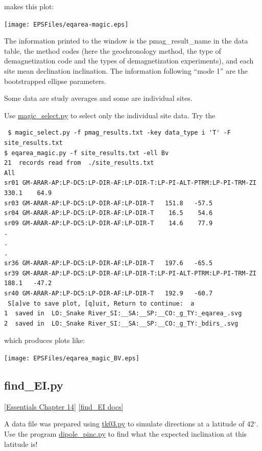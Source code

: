 \documentclass[11pt]{book}
\begin{document}
{{{\noindent makes this plot:

{%
 \texttt{[image: EPSFiles/eqarea-magic.eps]}}

The information printed to the window is the pmag\_result\_name in the data table, the method codes (here the geochronology method, the type of demagnetization code and the types of demagnetization experiments), and each site mean declination  inclination.    The information following ``mode 1'' are the bootstrapped ellipse parameters.

Some data are study averages and some are individual sites.

 Use \href{#magic_select.py}{magic\_select.py} to select only the individual site data.  Try the

 \begin{verbatim}
 $ magic_select.py -f pmag_results.txt -key data_type i 'T' -F site_results.txt
$ eqarea_magic.py -f site_results.txt -ell Bv
21  records read from  ./site_results.txt
All
sr01 GM-ARAR-AP:LP-DC5:LP-DIR-AF:LP-DIR-T:LP-PI-ALT-PTRM:LP-PI-TRM-ZI   330.1    64.9
sr03 GM-ARAR-AP:LP-DC5:LP-DIR-AF:LP-DIR-T   151.8   -57.5
sr04 GM-ARAR-AP:LP-DC5:LP-DIR-AF:LP-DIR-T    16.5    54.6
sr09 GM-ARAR-AP:LP-DC5:LP-DIR-AF:LP-DIR-T    14.6    77.9
.
.
.
sr36 GM-ARAR-AP:LP-DC5:LP-DIR-AF:LP-DIR-T   197.6   -65.5
sr39 GM-ARAR-AP:LP-DC5:LP-DIR-AF:LP-DIR-T:LP-PI-ALT-PTRM:LP-PI-TRM-ZI   188.1   -47.2
sr40 GM-ARAR-AP:LP-DC5:LP-DIR-AF:LP-DIR-T   192.9   -60.7
 S[a]ve to save plot, [q]uit, Return to continue:  a
1  saved in  LO:_Snake River_SI:__SA:__SP:__CO:_g_TY:_eqarea_.svg
2  saved in  LO:_Snake River_SI:__SA:__SP:__CO:_g_TY:_bdirs_.svg
\end{verbatim}

which produces plots like:

 \texttt{[image: EPSFiles/eqarea\_magic\_BV.eps]}



\subsection{find\_EI.py}
 \href{http://earthref.org/MAGIC/books/Tauxe/Essentials/WebBook3ch14.html#ch14}{ [Essentials Chapter 14]}%
\href{https://github.com/PmagPy/PmagPy/blob/master/programs/find_EI.py}{[find\_EI docs]}

A data file was prepared using \href{#tk03}{tk03.py} to simulate directions at a latitude of 42$^{\circ}$.   Use the program \href{#dipole_pinc.py}{dipole\_pinc.py} to find what the expected inclination at this latitude is!

}}}
\end{document}
